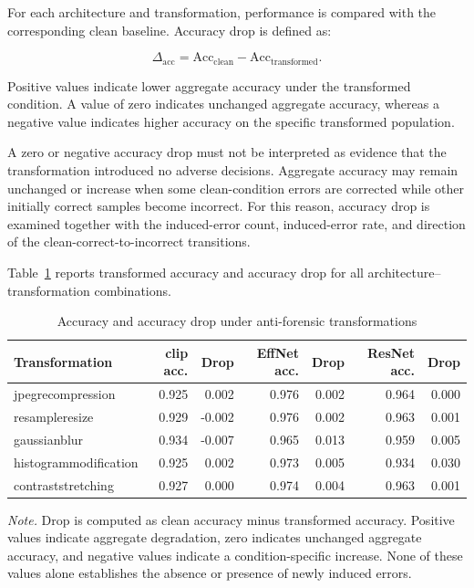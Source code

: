 For each architecture and transformation, performance is compared with the
corresponding clean baseline. Accuracy drop is defined as:

\begin{equation}
\Delta_{\mathrm{acc}}
=
\mathrm{Acc}_{\mathrm{clean}}
-
\mathrm{Acc}_{\mathrm{transformed}}.
\end{equation}

Positive values indicate lower aggregate accuracy under the transformed
condition. A value of zero indicates unchanged aggregate accuracy, whereas a
negative value indicates higher accuracy on the specific transformed
population.

A zero or negative accuracy drop must not be interpreted as evidence that the
transformation introduced no adverse decisions. Aggregate accuracy may remain
unchanged or increase when some clean-condition errors are corrected while
other initially correct samples become incorrect. For this reason, accuracy
drop is examined together with the induced-error count, induced-error rate, and
direction of the clean-correct-to-incorrect transitions.

Table~\ref{tab:results-antiforensic-robustness} reports transformed accuracy and
accuracy drop for all architecture--transformation combinations.

\begin{table}[H]
\centering
\scriptsize
\setlength{\tabcolsep}{3.3pt}
\renewcommand{\arraystretch}{1.15}
\caption{Accuracy and accuracy drop under anti-forensic transformations}
\label{tab:results-antiforensic-robustness}
\begin{tabular}{@{}l r r r r r r@{}}
\toprule
\textbf{Transformation} &
\textbf{\gls{clip} acc.} &
\textbf{Drop} &
\textbf{EffNet acc.} &
\textbf{Drop} &
\textbf{ResNet acc.} &
\textbf{Drop} \\
\midrule

\gls{jpegrecompression}
& 0.925
& 0.002
& 0.976
& 0.002
& 0.964
& 0.000 \\

\gls{resampleresize}
& 0.929
& -0.002
& 0.976
& 0.002
& 0.963
& 0.001 \\

\gls{gaussianblur}
& 0.934
& -0.007
& 0.965
& 0.013
& 0.959
& 0.005 \\

\gls{histogrammodification}
& 0.925
& 0.002
& 0.973
& 0.005
& 0.934
& 0.030 \\

\gls{contraststretching}
& 0.927
& 0.000
& 0.974
& 0.004
& 0.963
& 0.001 \\

\bottomrule
\end{tabular}

\vspace{0.4em}
\footnotesize
\textit{Note.} Drop is computed as clean accuracy minus transformed accuracy.
Positive values indicate aggregate degradation, zero indicates unchanged
aggregate accuracy, and negative values indicate a condition-specific increase.
None of these values alone establishes the absence or presence of newly induced
errors.
\end{table}

